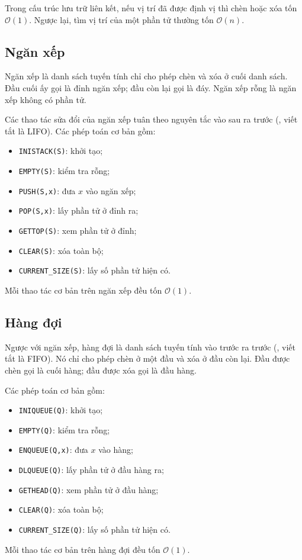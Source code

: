 \documentclass[11pt]{article}
\newcommand{\Oh}{\mathcal{O}}
\begin{document}
Trong cấu trúc lưu trữ liên kết, nếu vị trí đã được định vị thì chèn hoặc xóa
tốn \(\Oh(1)\). Ngược lại, tìm vị trí của một phần tử thường tốn \(\Oh(n)\).

\subsection{Ngăn xếp}

Ngăn xếp là danh sách tuyến tính chỉ cho phép chèn và xóa ở cuối danh sách.
Đầu cuối ấy gọi là đỉnh ngăn xếp; đầu còn lại gọi là đáy. Ngăn xếp rỗng là
ngăn xếp không có phần tử.

Các thao tác sửa đổi của ngăn xếp tuân theo nguyên tắc vào sau ra trước
(, viết tắt là LIFO). Các phép toán cơ bản gồm:
\begin{itemize}
  \item \texttt{INISTACK(S)}: khởi tạo;
  \item \texttt{EMPTY(S)}: kiểm tra rỗng;
  \item \texttt{PUSH(S,x)}: đưa \(x\) vào ngăn xếp;
  \item \texttt{POP(S,x)}: lấy phần tử ở đỉnh ra;
  \item \texttt{GETTOP(S)}: xem phần tử ở đỉnh;
  \item \texttt{CLEAR(S)}: xóa toàn bộ;
  \item \texttt{CURRENT\_SIZE(S)}: lấy số phần tử hiện có.
\end{itemize}
Mỗi thao tác cơ bản trên ngăn xếp đều tốn \(\Oh(1)\).

\subsection{Hàng đợi}

Ngược với ngăn xếp, hàng đợi là danh sách tuyến tính vào trước ra trước
(, viết tắt là FIFO). Nó chỉ cho phép chèn ở một đầu
và xóa ở đầu còn lại. Đầu được chèn gọi là cuối hàng; đầu được xóa gọi là đầu
hàng.

Các phép toán cơ bản gồm:
\begin{itemize}
  \item \texttt{INIQUEUE(Q)}: khởi tạo;
  \item \texttt{EMPTY(Q)}: kiểm tra rỗng;
  \item \texttt{ENQUEUE(Q,x)}: đưa \(x\) vào hàng;
  \item \texttt{DLQUEUE(Q)}: lấy phần tử ở đầu hàng ra;
  \item \texttt{GETHEAD(Q)}: xem phần tử ở đầu hàng;
  \item \texttt{CLEAR(Q)}: xóa toàn bộ;
  \item \texttt{CURRENT\_SIZE(Q)}: lấy số phần tử hiện có.
\end{itemize}
Mỗi thao tác cơ bản trên hàng đợi đều tốn \(\Oh(1)\).
\end{document}

